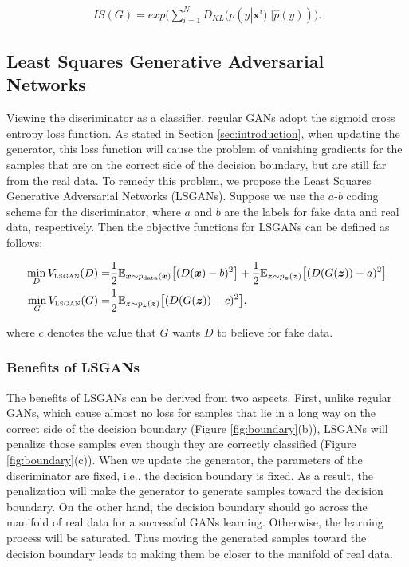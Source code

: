 \begin{equation}
\label{eq_IS2}
\begin{split}
IS(G) = exp\big(\sum^N_{i=1}D_{KL}(p(y|\bm{x}^i)||\hat{p}(y))\big).
\end{split}
\end{equation}


\subsection{Least Squares Generative Adversarial Networks}
Viewing the discriminator as a classifier, regular GANs adopt the sigmoid cross entropy loss function. As stated in Section \ref{sec:introduction}, when updating the generator, this loss function will cause the problem of vanishing gradients for the samples that are on the correct side of the decision boundary, but are still far from the real data. To remedy this problem, we propose the Least Squares Generative Adversarial Networks (LSGANs). Suppose we use the $a$-$b$ coding scheme for the discriminator, where $a$ and $b$ are the labels for fake data and real data,  respectively. Then the objective functions for LSGANs can be defined as follows:

\begin{equation}
\label{eq:lsgan}
\begin{split}
\min_D V_{\text{\tiny LSGAN}}(D) = &\frac{1}{2}\mathbb{E}_{\bm{x} \sim p_{\text{data}}(\bm{x})}\bigl[(D(\bm{x})-b)^2\bigr]+ \frac{1}{2}\mathbb{E}_{\bm{z} \sim p_{\bm{z}}(\bm{z})}\bigl[(D(G(\bm{z}))-a)^2\bigr] \\
\min_G V_{\text{\tiny LSGAN}}(G) = &\frac{1}{2}\mathbb{E}_{\bm{z} \sim p_{\bm{z}}(\bm{z})}\bigl[(D(G(\bm{z}))-c)^2\bigr],
\end{split}
\end{equation}


where $c$ denotes the value that $G$ wants $D$ to believe for fake data.

\subsubsection{Benefits of LSGANs}
The benefits of LSGANs can be derived from two aspects. First, unlike regular GANs, which cause almost no loss for samples that lie in a long way on the correct side of the decision boundary (Figure \ref{fig:boundary}(b)), LSGANs will penalize those samples even though they are correctly classified (Figure \ref{fig:boundary}(c)). When we update the generator, the parameters of the discriminator are fixed, i.e., the decision boundary is fixed. As a result, the penalization will make the generator to generate samples toward the decision boundary. On the other hand, the decision boundary should go across the manifold of real data for a successful GANs learning. Otherwise, the learning process will be saturated. Thus moving the generated samples toward the decision boundary leads to making them be closer to the manifold of real data. 

